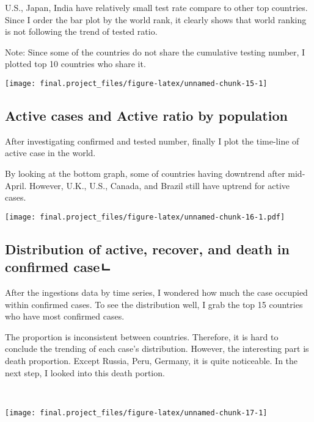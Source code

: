\documentclass[
  11pt,
]{article}
\begin{document}
U.S., Japan, India have relatively small test rate compare to other top
countries. Since I order the bar plot by the world rank, it clearly
shows that world ranking is not following the trend of tested ratio.

Note: Since some of the countries do not share the cumulative testing
number, I plotted top 10 countries who share it. ~

\begin{center}\texttt{[image: final.project\_files/figure-latex/unnamed-chunk-15-1]} \end{center}

\hypertarget{active-cases-and-active-ratio-by-population}{%
\subsection{Active cases and Active ratio by
population}\label{active-cases-and-active-ratio-by-population}}

After investigating confirmed and tested number, finally I plot the
time-line of active case in the world.

By looking at the bottom graph, some of countries having downtrend after
mid-April. However, U.K., U.S., Canada, and Brazil still have uptrend
for active cases.

\texttt{[image: final.project\_files/figure-latex/unnamed-chunk-16-1.pdf]}

\hypertarget{distribution-of-active-recover-and-death-in-confirmed-caseux3134}{%
\subsection{Distribution of active, recover, and death in confirmed
caseㄴ}\label{distribution-of-active-recover-and-death-in-confirmed-caseux3134}}

After the ingestions data by time series, I wondered how much the case
occupied within confirmed cases. To see the distribution well, I grab
the top 15 countries who have most confirmed cases.

The proportion is inconsistent between countries. Therefore, it is hard
to conclude the trending of each case's distribution. However, the
interesting part is death proportion. Except Russia, Peru, Germany, it
is quite noticeable. In the next step, I looked into this death portion.

~

\begin{center}\texttt{[image: final.project\_files/figure-latex/unnamed-chunk-17-1]} \end{center}
\end{document}
